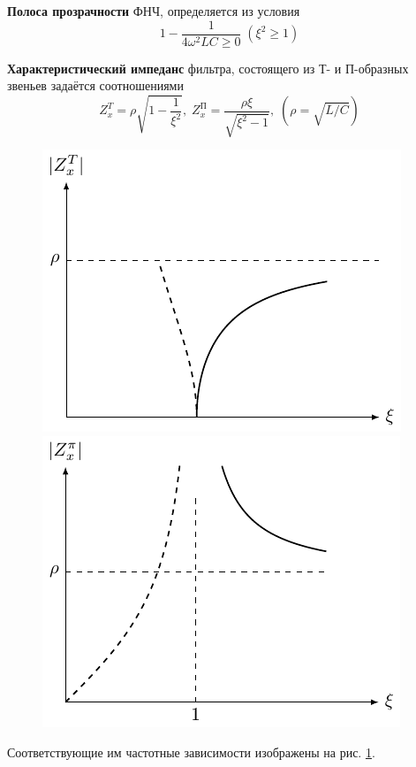 \textbf{Полоса прозрачности} ФНЧ, определяется из условия 
\begin{equation}
\label{eq:6.1.3}
1-\frac{1}{4\omega^2LC\geq0}\;(\xi^2\geq1)
\end{equation}

\textbf{Характеристический импеданс} фильтра, состоящего из Т- и П-образных звеньев задаётся соотношениями
\begin{equation}
Z^T_x=\rho\sqrt{1-\frac{1}{\xi^2}},\;
Z^{\text{П}}_x=\frac{\rho\xi}{\sqrt{\xi^2-1}},\;
(\rho=\sqrt{L/C})
\end{equation}
\begin{figure}[h!]
	\begin{minipage}{0.49\linewidth}
		\centering
		\includegraphics[]{chem/FHF/ZxP2.pdf}
	\end{minipage}
	\begin{minipage}{0.49\linewidth}
		\centering
		\includegraphics[]{chem/FHF/ZxT2.pdf}
	\end{minipage}
	\caption{}
	\label{fig:6.3}
\end{figure}
Соответствующие им частотные зависимости изображены на рис. \ref{fig:6.3}.

